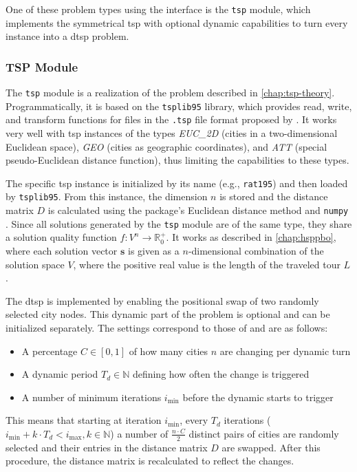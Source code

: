 One of these problem types using the interface is the \texttt{tsp} module, which implements the symmetrical \gls{tsp} with optional dynamic capabilities to turn every instance into a \gls{dtsp} problem.

\subsubsection{TSP Module}
\label{chap:tsp-module}

The \texttt{tsp} module is a realization of the problem described in \cref{chap:tsp-theory}. Programmatically, it is based on the \texttt{tsplib95} library, which provides read, write, and transform functions for files in the \texttt{.tsp} file format proposed by \citet{reinelt1991tsplib}. It works very well with \gls{tsp} instances of the types \textit{EUC\_2D} (cities in a two-dimensional Euclidean space), \textit{GEO} (cities as geographic coordinates), and \textit{ATT} (special pseudo-Euclidean distance function), thus limiting the capabilities to these types.

The specific \gls{tsp} instance is initialized by its name (e.g., \texttt{rat195}) and then loaded by \texttt{tsplib95}. From this instance, the dimension $n$ is stored and the distance matrix $D$ is calculated using the package's Euclidean distance method and \texttt{numpy} \cite{harris2020array}.
Since all solutions generated by the \texttt{tsp} module are of the same type, they share a solution quality function $f : V^n \rightarrow \mathbb{R}_{0}^{+}$. It works as described in \cref{chap:hsppbo}, where each solution vector $\mathbf{s}$ is given as a $n$-dimensional combination of the solution space $V$, where the positive real value is the length of the traveled tour $L$.

The \gls{dtsp} is implemented by enabling the positional swap of two randomly selected city nodes.
This dynamic part of the problem is optional and can be initialized separately. The settings correspond to those of \citet{kupfer2021hierarchical} and are as follows:
\begin{itemize}
	\item A percentage $C \in [0,1]$ of how many cities $n$ are changing per dynamic turn
	\item A dynamic period $T_{d} \in \mathbb{N}$ defining how often the change is triggered
	\item A number of minimum iterations $i_{\text{min}}$ before the dynamic starts to trigger
\end{itemize}
This means that starting at iteration $i_{\text{min}}$, every $T_{d}$ iterations ($i_{\text{min}} + k \cdot T_{d} < i_{\text{max}}, k \in \mathbb{N}$) a number of $\frac{n\cdot C}{2}$ distinct pairs of cities are randomly selected and their entries in the distance matrix $D$ are swapped. After this procedure, the distance matrix is recalculated to reflect the changes.

